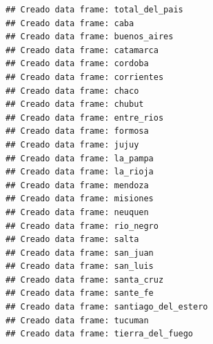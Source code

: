 \documentclass[
]{article}
\begin{document}
\begin{verbatim}
## Creado data frame: total_del_pais 
## Creado data frame: caba 
## Creado data frame: buenos_aires 
## Creado data frame: catamarca 
## Creado data frame: cordoba 
## Creado data frame: corrientes 
## Creado data frame: chaco 
## Creado data frame: chubut 
## Creado data frame: entre_rios 
## Creado data frame: formosa 
## Creado data frame: jujuy 
## Creado data frame: la_pampa 
## Creado data frame: la_rioja 
## Creado data frame: mendoza 
## Creado data frame: misiones 
## Creado data frame: neuquen 
## Creado data frame: rio_negro 
## Creado data frame: salta 
## Creado data frame: san_juan 
## Creado data frame: san_luis 
## Creado data frame: santa_cruz 
## Creado data frame: sante_fe 
## Creado data frame: santiago_del_estero 
## Creado data frame: tucuman 
## Creado data frame: tierra_del_fuego
\end{verbatim}
\end{document}
